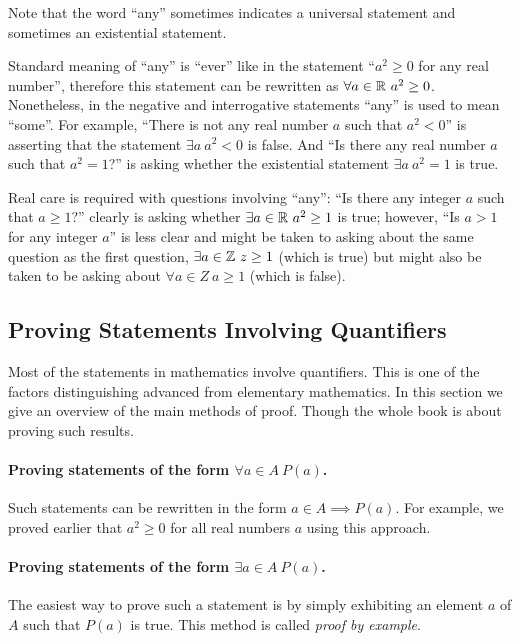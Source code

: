 \begin{warning}
  Note that the word ``any'' sometimes indicates a universal statement and
  sometimes an existential statement.

  Standard meaning of ``any'' is ``ever'' like in the statement ``$a^2 \ge 0$
  for any real number'', therefore this statement can be rewritten as
  $\forall a \in \mathbb{R} \ a^2 \ge 0$. Nonetheless, in the negative and interrogative
  statements ``any'' is used to mean ``some''. For example, ``There is not any
  real number $a$ such that $a^2 < 0$'' is asserting that the statement
  $\exists a \ a^2 < 0$ is false. And ``Is there any real number $a$ such that
  $a^2 = 1$?'' is asking whether the existential statement $\exists a \ a^2 =
  1$ is true.

  Real care is required with questions involving ``any'': ``Is there any
  integer $a$ such that $a \ge 1$?'' clearly is asking whether $\exists a \in
  \mathbb{R} \ a^2 \ge 1$ is true; however, ``Is $a > 1$ for any integer $a$'' is less
  clear and might be taken to asking about the same question as the first
  question, $\exists a \in \mathbb{Z} \ z \ge 1$ (which is true) but might also be
  taken to be asking about $\forall a \in Z \ a \ge 1$ (which is false).
\end{warning}

\subsection{Proving Statements Involving Quantifiers}
Most of the statements in mathematics involve quantifiers. This is one of the
factors distinguishing advanced from elementary mathematics. In this section we
give an overview of the main methods of proof. Though the whole book is about
proving such results.

\paragraph{Proving statements of the form $\forall a \in A \ P(a)$.}
Such statements can be rewritten in the form $a \in A \implies P(a)$. For
example, we proved earlier that $a^2 \ge 0$ for all real numbers $a$ using this
approach.

\paragraph{Proving statements of the form $\exists a \in A \ P(a)$.}
The easiest way to prove such a statement is by simply exhibiting an element $a$
of $A$ such that $P(a)$ is true. This method is called \textit{proof by
example}.

